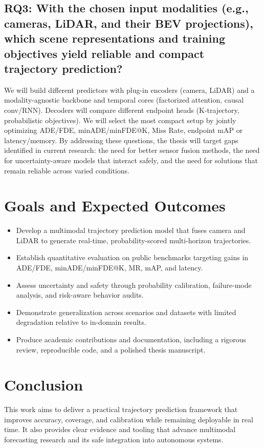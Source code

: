 \documentclass[12pt,a4paper]{report}
\begin{document}
\subsection*{RQ3: With the chosen input modalities (e.g., cameras, LiDAR, and their BEV projections), which scene representations and training objectives yield reliable and compact trajectory prediction?}
We will build different predictors with plug-in encoders (camera, LiDAR) and a modality-agnostic backbone and temporal cores (factorized attention, causal conv/RNN). Decoders will compare different endpoint heads (K-trajectory, probabilistic objectives). We will select the most compact setup by jointly optimizing ADE/FDE, minADE/minFDE@K, Miss Rate, endpoint mAP or latency/memory.
By addressing these questions, the thesis will target gaps identified in current research: the need for better sensor fusion methods, the need for uncertainty-aware models that interact safely, and the need for solutions that remain reliable across varied conditions.



\section{Goals and Expected Outcomes}
\begin{itemize}
  \item Develop a multimodal trajectory prediction model that fuses camera and LiDAR to generate real-time, probability-scored multi-horizon trajectories.
  \item Establish quantitative evaluation on public benchmarks targeting gains in ADE/FDE, minADE/minFDE@K, MR, mAP, and latency.
  \item Assess uncertainty and safety through probability calibration, failure-mode analysis, and risk-aware behavior audits.
  \item Demonstrate generalization across scenarios and datasets with limited degradation relative to in-domain results.
  \item Produce academic contributions and documentation, including a rigorous review, reproducible code, and a polished thesis manuscript.
\end{itemize}

\section{Conclusion}
\quad This work aims to deliver a practical trajectory prediction framework that improves accuracy, coverage, and calibration while remaining deployable in real time. It also provides clear evidence and tooling that advance multimodal forecasting research and its safe integration into autonomous systems.
\end{document}
